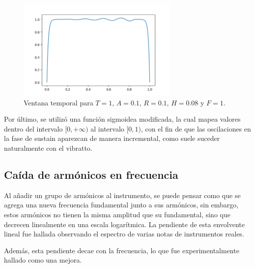 \begin{figure}[H]
	\centering
	\includegraphics[width=0.7\textwidth]{ImagenesEjercicio2/adsr.png}
	\caption{Ventana temporal para $T = 1$, $A = 0.1$, $R = 0.1$, $H = 0.08$ y $F = 1$.}
	\label{vib}
\end{figure}

Por último, se utilizó una función sigmoidea modificada, la cual mapea valores dentro del intervalo $[0, +\infty)$ al intervalo $[0, 1)$, con el fin de que las oscilaciones en la fase de sustain aparezcan de manera incremental, como suele suceder naturalmente con el vibratto.

\subsection{Caída de armónicos en frecuencia}

Al añadir un grupo de armónicos al instrumento, se puede pensar como que se agrega una nueva frecuencia fundamental junto a sus armónicos, sin embargo, estos armónicos no tienen la misma amplitud que su fundamental, sino que decrecen linealmente en una escala logarítmica. La pendiente de esta envolvente lineal fue hallada observando el espectro de varias notas de instrumentos reales.

Además, esta pendiente decae con la frecuencia, lo que fue experimentalmente hallado como una mejora.

